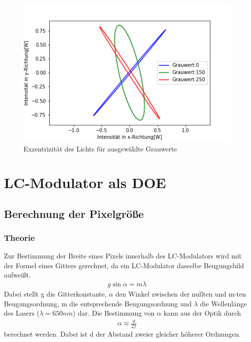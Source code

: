 \begin{figure}[h!]
	\centering
	\includegraphics[scale=0.6]{Ellipse.png}
	\caption{Exzentrizität des Lichts für ausgewählte Grauwerte}
	\label{Ellipse}
\end{figure}





\section{LC-Modulator als DOE}
\subsection{Berechnung der Pixelgröße}
\subsubsection{Theorie}
Zur Bestimmung der Breite eines Pixels innerhalb des LC-Modulators wird mit der Formel eines Gitters gerechnet, da ein LC-Modulator dasselbe Beugungsbild aufweißt.
\begin{align}
	g\sin{\alpha} = m\lambda
	\label{gbestimm}
\end{align}
Dabei stellt g die Gitterkonstante, $\alpha$ den Winkel zwischen der nullten und m-ten Beugungsordnung, m die entsprechende Beugungsordnung und $\lambda$ die Wellenlänge des Lasers ($\lambda = 650nm$) dar.
Die Bestimmung von $\alpha$ kann aus der Optik durch
\begin{align}
	\alpha \approx \frac{d}{2f}
	\label{abestimm}
\end{align}
berechnet werden. Dabei ist d der Abstand zweier gleicher höherer Ordnungen. 
